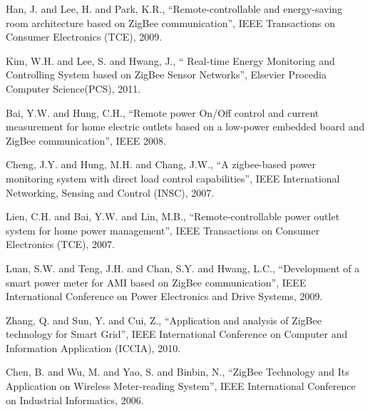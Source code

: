 \documentclass[10pt, conference, compsocconf]{IEEEtran}
\begin{document}
\begin{thebibliography}{1}

Han, J. and Lee, H. and Park, K.R., ``Remote-controllable and energy-saving room architecture based on ZigBee communication'', IEEE Transactions on Consumer Electronics  (TCE), 2009.

Kim, W.H. and Lee, S. and Hwang, J., `` Real-time Energy Monitoring and Controlling System based on ZigBee Sensor Networks'', Elsevier Procedia Computer Science(PCS), 2011.

Bai, Y.W. and Hung, C.H., ``Remote power On/Off control and current measurement for home electric outlets based on a low-power embedded board and ZigBee communication'', IEEE 2008.

Cheng, J.Y. and Hung, M.H. and Chang, J.W., ``A zigbee-based power monitoring system with direct load control capabilities'', IEEE International  Networking, Sensing and Control (INSC), 2007.

Lien, C.H. and Bai, Y.W. and Lin, M.B., ``Remote-controllable power outlet system for home power management'', IEEE Transactions on Consumer Electronics (TCE), 2007.

Luan, S.W. and Teng, J.H. and Chan, S.Y. and Hwang, L.C., ``Development of a smart power meter for AMI based on ZigBee communication'', IEEE International Conference on Power Electronics and Drive Systems, 2009.

Zhang, Q. and Sun, Y. and Cui, Z., ``Application and analysis of ZigBee technology for Smart Grid'', IEEE International Conference on Computer and Information Application (ICCIA), 2010.

Chen, B. and Wu, M. and Yao, S. and Binbin, N., ``ZigBee Technology and Its Application on Wireless Meter-reading System'',  IEEE International Conference on Industrial Informatics, 2006.

\end{thebibliography}
\end{document}
